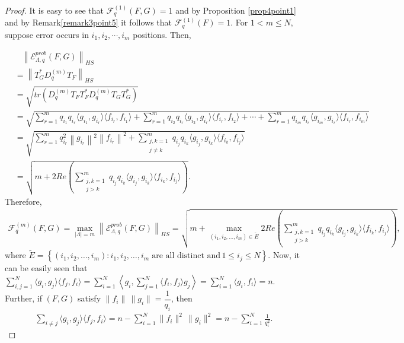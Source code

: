 \documentclass[final,1p,times]{elsarticle}
\begin{document}
\begin{proof}
It  is easy to see that $\mathcal{F}_{q}^{(1)} (F, G) = 1$ and by Proposition \ref{prop4point1} and by  Remark\ref{remark3point5} it follows that  $\mathcal{F}^{(1)}_{q} (F) = 1.$ For $ 1 <m \leq N,$ suppose error occurs in $i_1, i_2, \cdots ,i_m$ positions. Then,
  
  \begin{align} \label{eqn3point6}
     &\;\;\;\left\|\mathcal{E}_{\Lambda,q}^{prob}(F,G)\right\|_{HS} \nonumber\\&= \left\|T_{G}^*D_{q}^{(m)}T_F\right\|_{HS} \nonumber \\&=  \sqrt{tr(D_{q}^{(m)}T_FT_{F}^*D_{q}^{(m)}T_GT_{G}^*)}  \nonumber \\&= \sqrt{\sum_{r=1}^m q_{i_1}q_{i_r}\langle g_{i_1}, g_{i_r} \rangle \langle f_{i_r}, f_{i_1} \rangle + \sum_{r=1}^m q_{i_2}q_{i_r}\langle g_{i_2}, g_{i_r} \rangle \langle f_{i_r}, f_{i_2} \rangle + \cdots + \sum_{r=1}^m q_{i_m}q_{i_r}\langle g_{i_m}, g_{i_r} \rangle \langle f_{i_r}, f_{i_m} \rangle  } \nonumber\\&= \sqrt{\sum_{r=1}^m q_{i_r}^2\left\| g_{i_r} \right\|^2\left\| f_{i_r} \right\|^2 + \sum_{\substack{j,k=1 \\ j\neq k}}^m q_{i_j}q_{i_k}\langle g_{i_j}, g_{i_k} \rangle \langle f_{i_k}, f_{i_j} \rangle } \nonumber\\&= \sqrt{m + 2 Re \left( \sum_{\substack{j,k=1 \\ j> k }}^m q_{i_j}q_{i_k}\langle g_{i_j}, g_{i_k} \rangle \langle f_{i_k}, f_{i_j} \rangle  \right)} .
  \end{align}
  Therefore,
  \begin{align} \label{eqn3point7}
      \mathcal{F}_{q}^{(m)} (F, G) = \max\limits_{|\Lambda |=m} \left\|\mathcal{E}_{\Lambda,q}^{prob}(F,G)\right\|_{HS} = \sqrt{m + \max\limits_{(i_1,i_2,\ldots,i_m)\in \tilde{E}} 2Re\left( \sum_{\substack{j,k=1 \\ j> k \\ }}^m q_{i_j}q_{i_k} \langle g_{i_j}, g_{i_k} \rangle \langle f_{i_k}, f_{i_j} \rangle \right)},
  \end{align}
where $\tilde{E} = \left\{ (i_1,i_2,\ldots,i_m): i_1,i_2,\ldots,i_m \;\text{are all distinct and}\, 1 \leq i_j \leq N  \right\}.$
  Now, it can be easily seen that $\sum\limits_{i,j=1}^N \langle g_i, g_j \rangle \langle f_j, f_i \rangle = \sum\limits_{i=1}^N \left\langle g_i,\sum\limits_{j=1}^N \langle f_i, f_j \rangle g_j \right\rangle = \sum\limits_{i=1}^N \langle g_i ,f_i \rangle =n. $ Further, if $(F,G)$ satisfy $\|f_i\|\,\|g_i\| = \dfrac{1}{q_i}$, then
			\begin{align}\label{eqation7}
				\displaystyle{\sum_{i \neq j} \langle g_i, g_j \rangle \langle f_j, f_i \rangle} = n-\sum\limits_{i=1}^N \|f_i\|^2\,\|g_i\|^2 =n -\displaystyle{\sum_{i=1}^N \frac{1}{q_{i}^2}}.
			\end{align}	




\end{proof}
\end{document}
